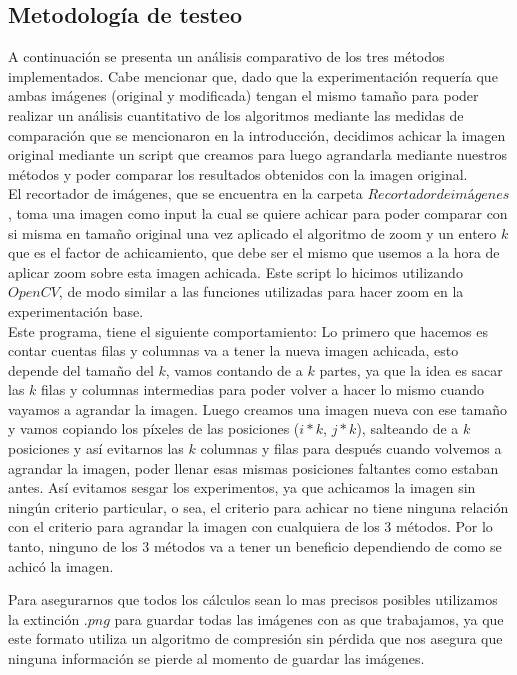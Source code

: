 \subsection{Metodología de testeo}
A continuación se presenta un análisis comparativo de los tres métodos implementados.
Cabe mencionar que, dado que la experimentación requería que ambas imágenes (original y modificada) tengan el mismo tamaño para poder realizar un análisis cuantitativo de los algoritmos mediante las medidas de comparación que se mencionaron en la introducción, decidimos achicar la imagen original mediante un script que creamos para luego agrandarla mediante nuestros métodos y poder comparar los resultados obtenidos con la imagen original.
\\
El recortador de imágenes, que se encuentra en la carpeta $Recortador de imágenes$, toma una imagen como input la cual se quiere achicar para poder comparar con si misma en tamaño original una vez aplicado el algoritmo de zoom y un entero $k$ que es el factor de achicamiento, que debe ser el mismo que usemos a la hora de aplicar zoom sobre esta imagen achicada. Este script lo hicimos utilizando $OpenCV$, de modo similar a las funciones utilizadas para hacer zoom en la experimentación base.
\\ 
Este programa, tiene el siguiente comportamiento:
Lo primero que hacemos es contar cuentas filas y columnas va a tener la nueva imagen achicada, esto depende del tamaño del $k$, vamos contando de a $k$ partes, ya que la idea es sacar las $k$ filas y columnas intermedias para poder volver a hacer lo mismo cuando vayamos a agrandar la imagen. Luego creamos una imagen nueva con ese tamaño y vamos copiando los píxeles de las posiciones ($i*k$, $j*k$), salteando de a $k$ posiciones y así evitarnos las $k$ columnas y filas para después cuando volvemos a agrandar la imagen, poder llenar esas mismas posiciones faltantes como estaban antes. Así evitamos sesgar los experimentos, ya que achicamos la imagen sin ningún criterio particular, o sea, el criterio para achicar no tiene ninguna relación con el criterio para agrandar la imagen con cualquiera de los 3 métodos. Por lo tanto, ninguno de los $3$ métodos va a tener un beneficio dependiendo de como se achicó la imagen.   

Para asegurarnos que todos los cálculos sean lo mas precisos posibles utilizamos la extinción $.png$ para guardar todas las imágenes con as que trabajamos, ya que este formato utiliza un algoritmo de compresión sin pérdida que nos asegura que ninguna información se pierde al momento de guardar las imágenes.

